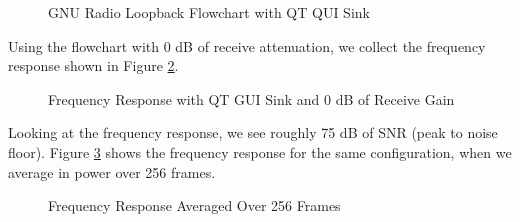 \documentclass{article}
\begin{document}
\begin{figure}[H]
	\centerline{}
	\caption{GNU Radio Loopback Flowchart with QT QUI Sink}
	\label{fig::gnu_radio_loopback_flowchart_qt_gui_sink}
\end{figure}

Using the flowchart with 0 dB of receive attenuation, we collect the frequency response shown in Figure \ref{fig::gnu_radio_loopback_qt_gui_sink}.
 
\begin{figure}[H]
	\centerline{}
	\caption{Frequency Response with QT GUI Sink and 0 dB of Receive Gain}
	\label{fig::gnu_radio_loopback_qt_gui_sink}
\end{figure}

Looking at the frequency response, we see roughly 75 dB of SNR (peak to noise floor). Figure \ref{fig::gnu_radio_loopback_qt_gui_sink_avg_256} shows the frequency response for the same configuration, when we average in power over 256 frames.

\begin{figure}[H]
	\centerline{}
	\caption{Frequency Response Averaged Over 256 Frames}
	\label{fig::gnu_radio_loopback_qt_gui_sink_avg_256}
\end{figure}
\end{document}
